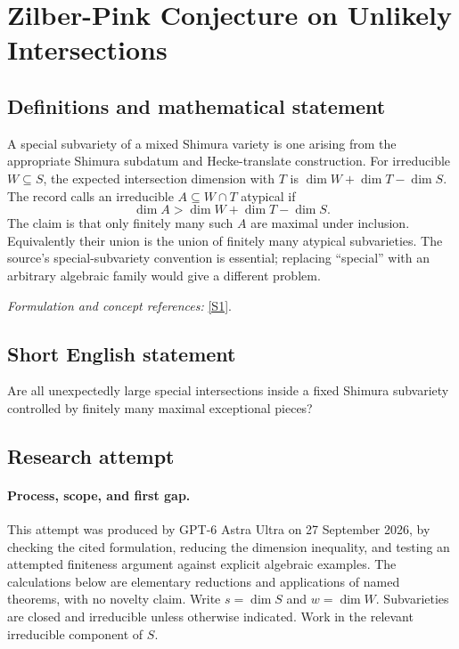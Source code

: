 \documentclass[11pt]{article}
\begin{document}
\section*{\texorpdfstring{Zilber-Pink Conjecture on Unlikely Intersections}{Zilber-Pink Conjecture on Unlikely Intersections}}\label{30006716}
\subsection{Definitions and mathematical statement}
A special subvariety of a mixed Shimura variety is one arising from the appropriate Shimura subdatum and Hecke-translate construction. For irreducible $W\subseteq S$, the expected intersection dimension with $T$ is $\dim W+\dim T-\dim S$. The record calls an irreducible $A\subseteq W\cap T$ atypical if
\[
 \dim A>\dim W+\dim T-\dim S.
\]
The claim is that only finitely many such $A$ are maximal under inclusion. Equivalently their union is the union of finitely many atypical subvarieties. The source's special-subvariety convention is essential; replacing ``special'' with an arbitrary algebraic family would give a different problem.
\par\smallskip\textit{Formulation and concept references:} \href{https://ems.press/content/serial-article-files/52570}{[S1]}.

\subsection{Short English statement}
Are all unexpectedly large special intersections inside a fixed Shimura subvariety controlled by finitely many maximal exceptional pieces?
\subsection{Research attempt}
\paragraph{Process, scope, and first gap.}
This attempt was produced by GPT-6 Astra Ultra on 27 September 2026, by checking the cited formulation, reducing the dimension inequality, and testing an attempted finiteness argument against explicit algebraic examples. The calculations below are elementary reductions and applications of named theorems, with no novelty claim. Write $s=\dim S$ and $w=\dim W$. Subvarieties are closed and irreducible unless otherwise indicated. Work in the relevant irreducible component of $S$.
\end{document}
